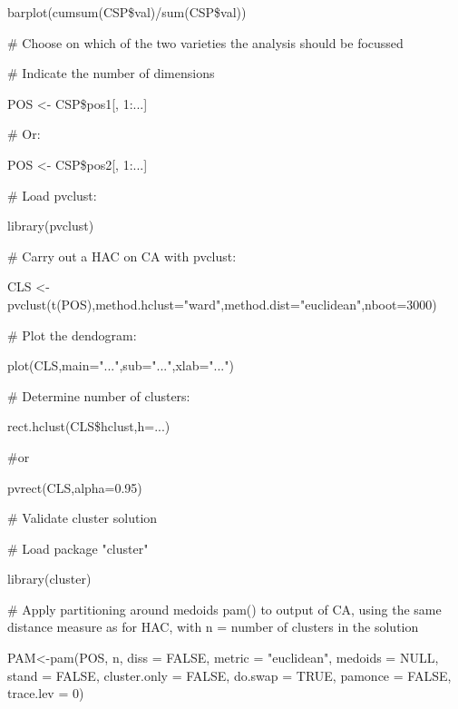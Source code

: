 barplot(cumsum(CSP\$val)/sum(CSP\$val))



\# Choose on which of the two varieties the analysis should be focussed



\# Indicate the number of dimensions



POS <- CSP\$pos1[, 1:...]



\# Or:



POS <- CSP\$pos2[, 1:...]



\# Load pvclust:



library(pvclust)



\# Carry out a HAC on CA with pvclust:



CLS <- pvclust(t(POS),method.hclust="ward",method.dist="euclidean",nboot=3000)



\# Plot the dendogram:



plot(CLS,main="...",sub="...",xlab="...")



\# Determine number of clusters:



rect.hclust(CLS\$hclust,h=...)



\#or



pvrect(CLS,alpha=0.95)



\# Validate cluster solution



\# Load package "cluster"



library(cluster)



\# Apply partitioning around medoids pam() to output of CA, using the same distance measure as for HAC, with n = number of clusters in the solution



PAM<-pam(POS, n, diss = FALSE, metric = "euclidean", medoids = NULL, stand = FALSE, cluster.only = FALSE, do.swap = TRUE, pamonce = FALSE, trace.lev = 0)



